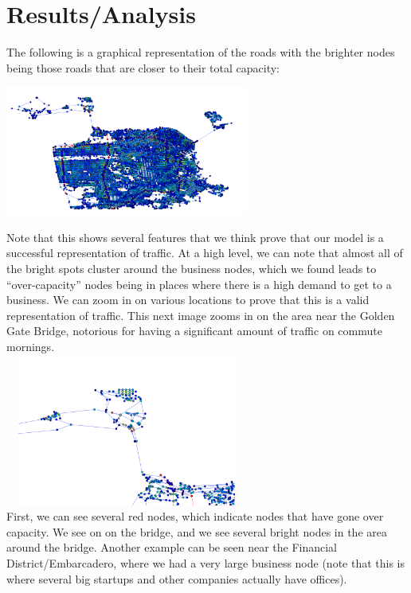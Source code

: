 \documentclass{article}
\begin{document}
\section{Results/Analysis}
The following is a graphical representation of the roads with the brighter nodes being those roads that are closer to their total capacity: \\
\includegraphics[width=8cm,height=5cm]{../figs/f1}\\
Note that this shows several features that we think prove that our model is a successful representation of traffic. At a high level, we can note that almost all of the bright spots cluster around the business nodes, which we found leads to ``over-capacity'' nodes being in places where there is a high demand to get to a business. We can zoom in on various locations to prove that this is a valid representation of traffic. This next image zooms in on the area near the Golden Gate Bridge, notorious for having a significant amount of traffic on commute mornings. \\
 \includegraphics[width=8cm,height=5cm]{../figs/f2} \\
First, we can see several red nodes, which indicate nodes that have gone over capacity. We see on on the bridge, and we see several bright nodes in the area around the bridge. Another example can be seen near the Financial District/Embarcadero, where we had a very large business node (note that this is where several big startups and other companies actually have offices). \\
\end{document}
